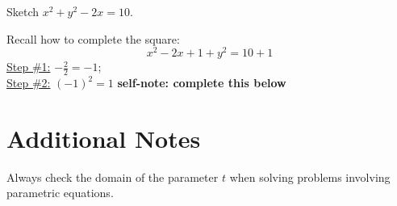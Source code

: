 \documentclass{article}
\begin{document}
\begin{examplebox}
Sketch \( x^2 + y^2 - 2x = 10 \).

\begin{solutionbox}
Recall how to complete the square:
\[
    x^2 - 2x + 1 + y^2 = 10 + 1
\]
\underline{Step \#1:} \( -\frac{2}{2} = -1 \); \\
\underline{Step \#2:} \( (-1)^2 = 1 \) 
\textbf{self-note: complete this below} 
\end{solutionbox}
\end{examplebox}

\section*{Additional Notes}
\begin{notebox}
Always check the domain of the parameter $t$ when solving problems involving parametric equations.
\end{notebox}
\end{document}
